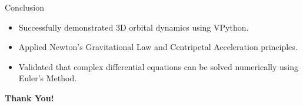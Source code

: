 \documentclass{beamer}
\begin{document}
\begin{frame}{Conclusion}
    \begin{itemize}
        \item Successfully demonstrated 3D orbital dynamics using VPython.
        \item Applied Newton’s Gravitational Law and Centripetal Acceleration principles.
        \item Validated that complex differential equations can be solved numerically using Euler’s Method.
    \end{itemize}
    
    \vspace{1cm}
    \begin{center}
        \Large \textbf{Thank You! \\ }
    \end{center}
\end{frame}
\end{document}
